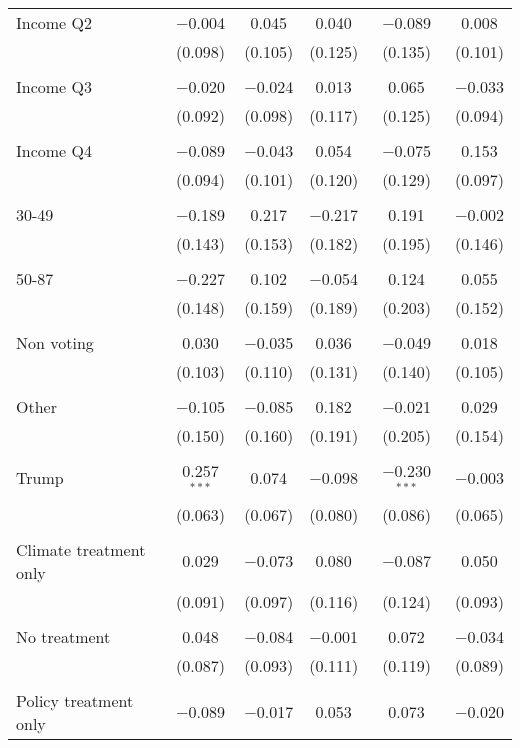 \begin{tabular}{@{\extracolsep{5pt}}lccccc}
 Income Q2 & $-$0.004 & 0.045 & 0.040 & $-$0.089 & 0.008 \\ 
  & (0.098) & (0.105) & (0.125) & (0.135) & (0.101) \\ 
  & & & & & \\ 
 Income Q3 & $-$0.020 & $-$0.024 & 0.013 & 0.065 & $-$0.033 \\ 
  & (0.092) & (0.098) & (0.117) & (0.125) & (0.094) \\ 
  & & & & & \\ 
 Income Q4 & $-$0.089 & $-$0.043 & 0.054 & $-$0.075 & 0.153 \\ 
  & (0.094) & (0.101) & (0.120) & (0.129) & (0.097) \\ 
  & & & & & \\ 
 30-49 & $-$0.189 & 0.217 & $-$0.217 & 0.191 & $-$0.002 \\ 
  & (0.143) & (0.153) & (0.182) & (0.195) & (0.146) \\ 
  & & & & & \\ 
 50-87 & $-$0.227 & 0.102 & $-$0.054 & 0.124 & 0.055 \\ 
  & (0.148) & (0.159) & (0.189) & (0.203) & (0.152) \\ 
  & & & & & \\ 
 Non voting & 0.030 & $-$0.035 & 0.036 & $-$0.049 & 0.018 \\ 
  & (0.103) & (0.110) & (0.131) & (0.140) & (0.105) \\ 
  & & & & & \\ 
 Other & $-$0.105 & $-$0.085 & 0.182 & $-$0.021 & 0.029 \\ 
  & (0.150) & (0.160) & (0.191) & (0.205) & (0.154) \\ 
  & & & & & \\ 
 Trump & 0.257$^{***}$ & 0.074 & $-$0.098 & $-$0.230$^{***}$ & $-$0.003 \\ 
  & (0.063) & (0.067) & (0.080) & (0.086) & (0.065) \\ 
  & & & & & \\ 
 Climate treatment only & 0.029 & $-$0.073 & 0.080 & $-$0.087 & 0.050 \\ 
  & (0.091) & (0.097) & (0.116) & (0.124) & (0.093) \\ 
  & & & & & \\ 
 No treatment & 0.048 & $-$0.084 & $-$0.001 & 0.072 & $-$0.034 \\ 
  & (0.087) & (0.093) & (0.111) & (0.119) & (0.089) \\ 
  & & & & & \\ 
 Policy treatment only & $-$0.089 & $-$0.017 & 0.053 & 0.073 & $-$0.020 \\ 

\end{tabular}
